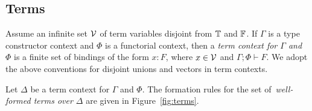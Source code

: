 \documentclass[runningheads]{llncs}
\newcommand{\fold}{\mathit{fold}}
\begin{document}
\begin{comment}
    \phi.\lambda \ol{\alpha}.H)\ol{\beta}][\ol{\alpha := \beta}]\,(\mu
  \phi.\lambda \ol{\alpha}.H)\ol{\beta}$}
\hspace*{0.2in}\DisplayProof\vspace*{-0.05in}
\\\\
\AXC{$\Gamma; \phi,\ol{\alpha}, \ol{\gamma} \vdash H$}
\AXC{$\Gamma; \ol{\beta}, \ol{\gamma} \vdash F$}
\BIC{$\Gamma; \emptyset  \,|\, \emptyset \vdash \fold^F_H :
  \Nat^\emptyset\; (\Nat^{\ol{\beta}, \ol{\gamma}}\,H[\phi
    :=_{\ol{\beta}} F][\ol{\alpha := \beta}]\,F)\; (\Nat^{\ol{\beta},
    \ol{\gamma}}\,(\mu \phi.\lambda \ol{\alpha}.H)\ol{\beta}\,F)$}
\hspace*{0.2in}\DisplayProof\vspace*{-0.1in}
\end{array}\]
\caption{Well-formed terms}\label{fig:terms} 
\end{minipage}}
\end{figure}
\end{comment}



\vspace*{-0.1in}

\subsection{Terms}\label{sec:terms}
Assume an infinite set $\cal V$ of term variables disjoint from
$\mathbb{T}$ and $\mathbb{F}$. If $\Gamma$ is a type constructor context and
$\Phi$ is a functorial context, then a {\em term context for $\Gamma$
  and $\Phi$} is a finite set of bindings of the form $x : F$, where
$x \in {\cal V}$ and $\Gamma; \Phi \vdash F$. We adopt the above
conventions for disjoint unions and vectors in term contexts.

Let $\Delta$ be a term context for $\Gamma$ and $\Phi$.  The formation
rules for the set of\, {\em well-formed terms over $\Delta$} are given
in Figure~\ref{fig:terms}.
\end{document}
